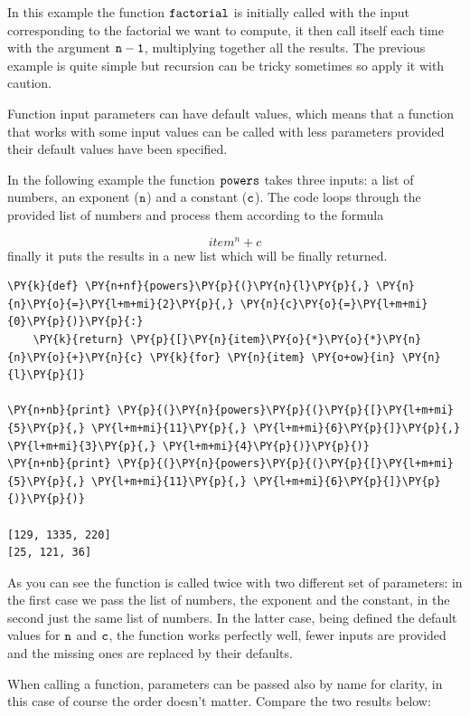 In this example the function $\tt{factorial}$ is initially called with the input corresponding 
to the factorial we want to compute, it then call itself each time with the argument $\tt{n-1}$, 
multiplying together all the results.
The previous example is quite simple but recursion can be tricky sometimes so apply it with caution. 

Function input parameters can have default values, which means that a function that works 
with some input values can be called with less parameters provided their default values have been specified.

In the following example the function $\tt{powers}$ takes three inputs: a list of numbers, 
an exponent ($\tt{n}$) and a constant ($\tt{c}$). The code loops through the provided list 
of numbers and process them according to the formula 

\[
item^{n} + c
\]
finally it puts the results in a new list which will be finally returned.

\begin{codebox}
\begin{Verbatim}[commandchars=\\\{\}]
\PY{k}{def} \PY{n+nf}{powers}\PY{p}{(}\PY{n}{l}\PY{p}{,} \PY{n}{n}\PY{o}{=}\PY{l+m+mi}{2}\PY{p}{,} \PY{n}{c}\PY{o}{=}\PY{l+m+mi}{0}\PY{p}{)}\PY{p}{:}
    \PY{k}{return} \PY{p}{[}\PY{n}{item}\PY{o}{*}\PY{o}{*}\PY{n}{n}\PY{o}{+}\PY{n}{c} \PY{k}{for} \PY{n}{item} \PY{o+ow}{in} \PY{n}{l}\PY{p}{]}

\PY{n+nb}{print} \PY{p}{(}\PY{n}{powers}\PY{p}{(}\PY{p}{[}\PY{l+m+mi}{5}\PY{p}{,} \PY{l+m+mi}{11}\PY{p}{,} \PY{l+m+mi}{6}\PY{p}{]}\PY{p}{,} \PY{l+m+mi}{3}\PY{p}{,} \PY{l+m+mi}{4}\PY{p}{)}\PY{p}{)}
\PY{n+nb}{print} \PY{p}{(}\PY{n}{powers}\PY{p}{(}\PY{p}{[}\PY{l+m+mi}{5}\PY{p}{,} \PY{l+m+mi}{11}\PY{p}{,} \PY{l+m+mi}{6}\PY{p}{]}\PY{p}{)}\PY{p}{)}

[129, 1335, 220]
[25, 121, 36]
\end{Verbatim}
\end{codebox}
    
As you can see the function is called twice with two different set of parameters: in the first 
case we pass the list of numbers, the exponent and the constant, in the second just the same 
list of numbers.
In the latter case, being defined the default values for $\tt{n}$ and $\tt{c}$, the function 
works perfectly well, fewer inputs are provided and the missing ones are replaced by their defaults. 

When calling a function, parameters can be passed also by name for clarity, in this case of 
course the order doesn't matter. Compare the two results below:

